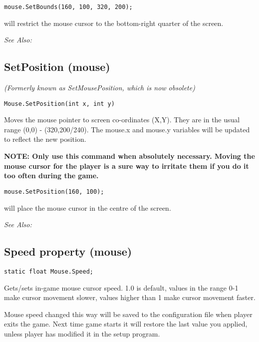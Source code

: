 \begin{verbatim}
mouse.SetBounds(160, 100, 320, 200);
\end{verbatim}
will restrict the mouse cursor to the bottom-right quarter of the screen.

\it{See Also:} 


\subsection{SetPosition (mouse)}\label{Mouse.SetPosition}%

\it{(Formerly known as SetMousePosition, which is now obsolete)}

\begin{verbatim}
Mouse.SetPosition(int x, int y)
\end{verbatim}

Moves the mouse pointer to screen co-ordinates (X,Y). They are
in the usual range (0,0) - (320,200/240). The mouse.x and mouse.y variables will be
updated to reflect the new position.

\bf{NOTE:} Only use this command when absolutely necessary. Moving the mouse cursor
for the player is a sure way to irritate them if you do it too often during the game.

\begin{verbatim}
mouse.SetPosition(160, 100);
\end{verbatim}
will place the mouse cursor in the centre of the screen.

\it{See Also:} 


\subsection{Speed property (mouse)}\label{Mouse.Speed}%

\begin{verbatim}
static float Mouse.Speed;
\end{verbatim}
Gets/sets in-game mouse cursor speed. 1.0 is default, values in the range 0-1 make cursor movement slower, values higher than 1 make cursor movement faster.

Mouse speed changed this way will be saved to the configuration file when player exits the game. Next time game starts it will restore the last value you applied, unless player has modified it in the setup program.

